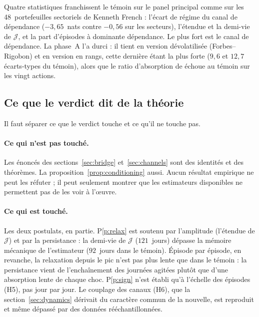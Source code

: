 \documentclass[11pt]{article}
\theoremstyle{definition}
\theoremstyle{remark}
\newcommand{\JJ}{\mathcal{J}}
\begin{document}
Quatre statistiques franchissent le témoin sur le panel principal comme sur
les 48~portefeuilles sectoriels de Kenneth French : l'écart de régime du canal
de dépendance ($-3{,}65$~nats contre $-0{,}56$ sur les secteurs), l'étendue et
la demi-vie de $\JJ$, et la part d'épisodes à dominante dépendance. Le plus fort
est le canal de dépendance. La phase~A l'a durci : il tient en version
dévolatilisée (Forbes--Rigobon) et en version en rangs, cette dernière étant la
plus forte ($9{,}6$ et $12{,}7$ écarts-types du témoin), alors que le ratio
d'absorption de \citet{kritzman2011} échoue au témoin sur les vingt actions.

\subsection{Ce que le verdict dit de la théorie}

Il faut séparer ce que le verdict touche et ce qu'il ne touche pas.

\paragraph{Ce qui n'est pas touché.} Les énoncés des
sections~\ref{sec:bridge} et~\ref{sec:channels} sont des identités et des
théorèmes. La proposition~\ref{prop:conditioning} aussi. Aucun résultat empirique
ne peut les réfuter ; il peut seulement montrer que les estimateurs disponibles
ne permettent pas de les voir à l'\oe uvre.

\paragraph{Ce qui est touché.} Les deux postulats, en partie. P\ref{p:relax}
est soutenu par l'amplitude (l'étendue de $\JJ$) et par la persistance : la
demi-vie de $\JJ$ ($121$~jours) dépasse la mémoire mécanique de l'estimateur
($92$~jours dans le témoin). Épisode par épisode, en revanche, la relaxation
depuis le pic n'est pas plus lente que dans le témoin : la persistance vient de
l'enchaînement des journées agitées plutôt que d'une absorption lente de chaque
choc. P\ref{p:sign} n'est établi qu'à l'échelle des épisodes (H5), pas jour par
jour. Le couplage des canaux (H6), que la
section~\ref{sec:dynamics} dérivait du caractère commun de la nouvelle, est
reproduit et même dépassé par des données rééchantillonnées.
\end{document}
